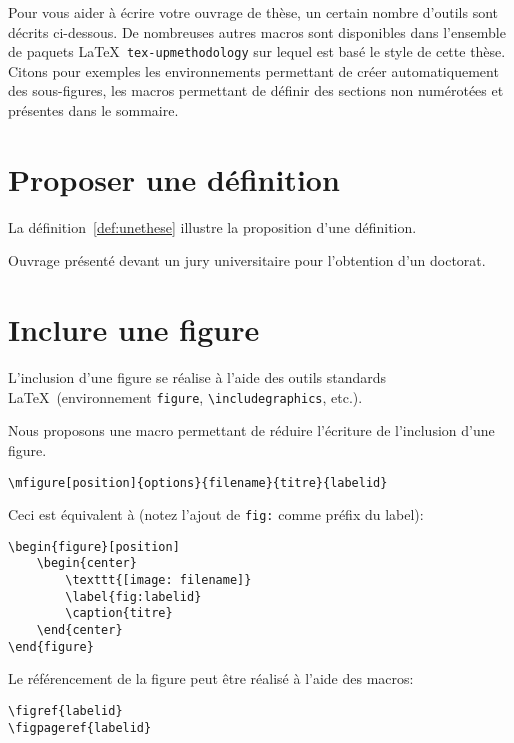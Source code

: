 \documentclass[french]{spimutbmphdthesis}
\begin{document}
\chapterintro

Pour vous aider à écrire votre ouvrage de thèse, un certain nombre d'outils sont décrits ci-dessous.
De nombreuses autres macros sont disponibles dans l'ensemble de paquets \LaTeX\ \texttt{tex-upmethodology}
sur lequel est basé le style de cette thèse. Citons pour exemples les environnements permettant de créer
automatiquement des sous-figures, les macros permettant de définir des sections non numérotées et présentes
dans le sommaire.

\section{Proposer une définition}

La définition~\ref{def:unethese} illustre la proposition d'une définition.

\begin{definition} \label{def:unethese}
Ouvrage présenté devant un jury universitaire pour l'obtention d'un doctorat.
\end{definition}

\section{Inclure une figure}

L'inclusion d'une figure se réalise à l'aide des outils standards \LaTeX\ (environnement \texttt{figure}, \texttt{{\textbackslash}includegraphics}, etc.).

Nous proposons une macro permettant de réduire l'écriture de l'inclusion d'une figure.

\begin{verbatim}
\mfigure[position]{options}{filename}{titre}{labelid}
\end{verbatim}

Ceci est équivalent à (notez l'ajout de \texttt{fig:} comme préfix du label):
\begin{verbatim}
\begin{figure}[position]
	\begin{center}
		\texttt{[image: filename]}
		\label{fig:labelid}
		\caption{titre}
	\end{center}
\end{figure}
\end{verbatim}

Le référencement de la figure peut être réalisé à l'aide des macros:
\begin{verbatim}
\figref{labelid}
\figpageref{labelid}
\end{verbatim}
\end{document}
